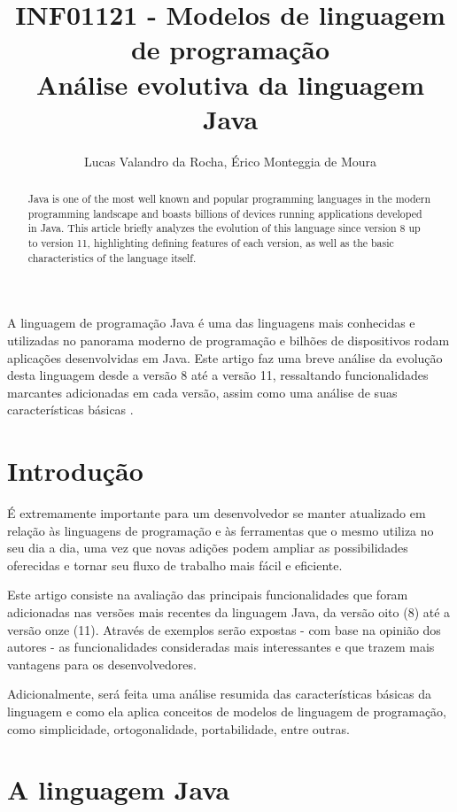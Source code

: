 \documentclass[12pt]{article}
\title{INF01121 - Modelos de linguagem de programação\\ Análise evolutiva da linguagem Java}
\author{Lucas Valandro da Rocha, Érico Monteggia de Moura}
\begin{document}
 

\maketitle

\begin{abstract}
  Java is one of the most well known and popular programming languages in the modern programming landscape and boasts billions of devices running applications developed in Java. This article briefly analyzes the evolution of this language since version 8 up to version 11, highlighting defining features of each version, as well as the basic characteristics of the language itself.
\end{abstract}
     
\begin{resumo} 
  A linguagem de programação Java é uma das linguagens mais conhecidas e utilizadas no panorama moderno de programação e bilhões de dispositivos rodam aplicações desenvolvidas em Java. Este artigo faz uma breve análise da evolução desta linguagem desde a versão 8 até a versão 11, ressaltando funcionalidades marcantes adicionadas em cada versão, assim como uma análise de suas características básicas .
\end{resumo}


\section{Introdução}

É extremamente importante para um desenvolvedor se manter atualizado em relação às linguagens de programação e às ferramentas que o mesmo utiliza no seu dia a dia, uma vez que novas adições podem ampliar as possibilidades oferecidas e tornar seu fluxo de trabalho mais fácil e eficiente. 

Este artigo consiste na avaliação das principais funcionalidades que foram adicionadas nas versões mais recentes da linguagem Java, da versão oito (8) até a versão onze (11). Através de exemplos serão expostas - com base na opinião dos autores - as funcionalidades consideradas mais interessantes e que trazem mais vantagens para os desenvolvedores.

Adicionalmente, será feita uma análise resumida das características básicas da linguagem e como ela aplica conceitos de modelos de linguagem de programação, como simplicidade, ortogonalidade, portabilidade, entre outras.

\section{A linguagem Java} \label{sec:firstpage}
\end{document}
